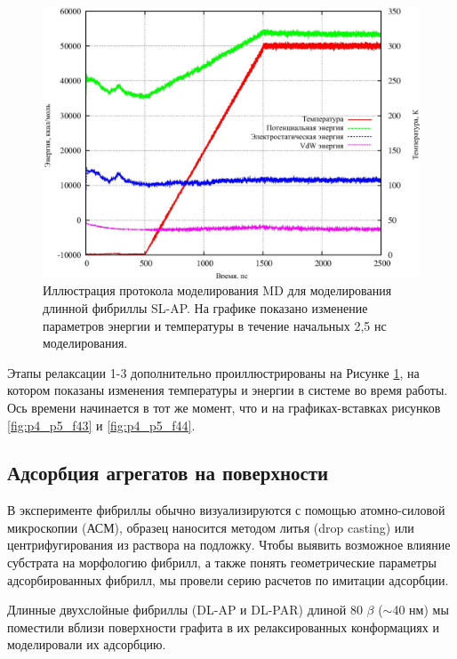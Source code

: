     
\begin{figure} [H]
    \centering
    \includegraphics[width=\textwidth]{images/p4/punkt5/part4_p5_f48.pdf}
    \caption[Иллюстрация протокола моделирования МД для моделирования длинной фибриллы SL-AP]{Иллюстрация протокола моделирования MD для моделирования длинной фибриллы SL-AP. На графике показано изменение параметров энергии и температуры в течение начальных 2,5 нс моделирования.}
    \label{fig:p4_p5_f48}
\end{figure}

    Этапы релаксации 1-3 дополнительно проиллюстрированы на Рисунке \ref{fig:p4_p5_f48}, на котором показаны изменения температуры и энергии в системе во время работы. Ось времени начинается в тот же момент, что и на графиках-вставках рисунков \ref{fig:p4_p5_f43} и \ref{fig:p4_p5_f44}.


\subsection{Адсорбция агрегатов на поверхности}

    В эксперименте фибриллы обычно визуализируются с помощью атомно-силовой микроскопии (АСМ), образец наносится методом литья (drop casting) или центрифугирования из раствора на подложку. Чтобы выявить возможное влияние субстрата на морфологию фибрилл, а также понять геометрические параметры адсорбированных фибрилл, мы провели серию расчетов по имитации адсорбции.

    Длинные двухслойные фибриллы (DL-AP и DL-PAR) длиной 80 $\beta$ ($\sim$40 нм) мы поместили вблизи поверхности графита в их релаксированных конформациях и моделировали их адсорбцию.


